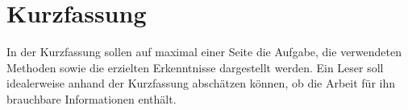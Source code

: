 \chapter*{Kurzfassung}
\thispagestyle{empty}
In der Kurzfassung sollen auf maximal einer Seite die Aufgabe, die verwendeten Methoden sowie die erzielten Erkenntnisse dargestellt werden. Ein Leser soll idealerweise anhand der Kurzfassung abschätzen können, ob die Arbeit für ihn brauchbare Informationen enthält.

\cleardoublepage